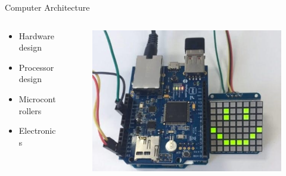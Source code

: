 \documentclass{beamer}
\begin{document}
\begin{frame}{Computer Architecture}
\begin{columns}
	\begin{column}{.40\textwidth}
		\begin{itemize}
			\item Hardware design
			\item Processor design
			\item Microcontrollers
			\item Electronics
		\end{itemize}
	\end{column}
	\begin{column}{.60\textwidth}
		\begin{figure}
			\includegraphics[width=\linewidth]{img/smiley.jpg}
		\end{figure}
	\end{column}
\end{columns}
\end{frame}
\end{document}
